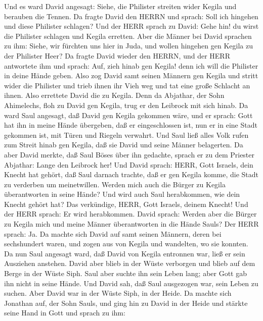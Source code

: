  Und es ward David angesagt: Siehe, die Philister streiten
wider Kegila und berauben die Tennen.  Da fragte David den
HERRN und sprach: Soll ich hingehen und diese Philister schlagen? Und
der HERR sprach zu David: Gehe hin! du wirst die Philister schlagen und
Kegila erretten.  Aber die Männer bei David sprachen zu ihm:
Siehe, wir fürchten uns hier in Juda, und wollen hingehen gen Kegila zu
der Philister Heer?  Da fragte David wieder den HERRN, und
der HERR antwortete ihm und sprach: Auf, zieh hinab gen Kegila! denn ich
will die Philister in deine Hände geben.  Also zog David
samt seinen Männern gen Kegila und stritt wider die Philister und trieb
ihnen ihr Vieh weg und tat eine große Schlacht an ihnen. Also errettete
David die zu Kegila.  Denn da Abjathar, der Sohn Ahimelechs,
floh zu David gen Kegila, trug er den Leibrock mit sich hinab.
 Da ward Saul angesagt, daß David gen Kegila gekommen wäre,
und er sprach: Gott hat ihn in meine Hände übergeben, daß er
eingeschlossen ist, nun er in eine Stadt gekommen ist, mit Türen und
Riegeln verwahrt.  Und Saul ließ alles Volk rufen zum Streit
hinab gen Kegila, daß sie David und seine Männer belagerten.
 Da aber David merkte, daß Saul Böses über ihn gedachte,
sprach er zu dem Priester Abjathar: Lange den Leibrock her!
 Und David sprach: HERR, Gott Israels, dein Knecht hat
gehört, daß Saul darnach trachte, daß er gen Kegila komme, die Stadt zu
verderben um meinetwillen.  Werden mich auch die Bürger zu
Kegila überantworten in seine Hände? Und wird auch Saul herabkommen, wie
dein Knecht gehört hat? Das verkündige, HERR, Gott Israels, deinem
Knecht! Und der HERR sprach: Er wird herabkommen.  David
sprach: Werden aber die Bürger zu Kegila mich und meine Männer
überantworten in die Hände Sauls? Der HERR sprach: Ja.  Da
machte sich David auf samt seinen Männern, deren bei sechshundert waren,
und zogen aus von Kegila und wandelten, wo sie konnten. Da nun Saul
angesagt ward, daß David von Kegila entronnen war, ließ er sein
Ausziehen anstehen.  David aber blieb in der Wüste
verborgen und blieb auf dem Berge in der Wüste Siph. Saul aber suchte
ihn sein Leben lang; aber Gott gab ihn nicht in seine Hände.
 Und David sah, daß Saul ausgezogen war, sein Leben zu
suchen. Aber David war in der Wüste Siph, in der Heide.  Da
machte sich Jonathan auf, der Sohn Sauls, und ging hin zu David in der
Heide und stärkte seine Hand in Gott  und sprach zu ihm:
